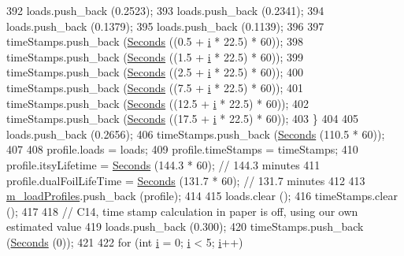 \begin{DoxyCode}
392       loads.push\_back (0.2523);
393       loads.push\_back (0.2341);
394       loads.push\_back (0.1379);
395       loads.push\_back (0.1139);
396 
397       timeStamps.push\_back (\hyperlink{group__timecivil_ga33c34b816f8ff6628e33d5c8e9713b9e}{Seconds} ((0.5 + \hyperlink{bernuolliDistribution_8m_a6f6ccfcf58b31cb6412107d9d5281426}{i} * 22.5) * 60));
398       timeStamps.push\_back (\hyperlink{group__timecivil_ga33c34b816f8ff6628e33d5c8e9713b9e}{Seconds} ((1.5 + \hyperlink{bernuolliDistribution_8m_a6f6ccfcf58b31cb6412107d9d5281426}{i} * 22.5) * 60));
399       timeStamps.push\_back (\hyperlink{group__timecivil_ga33c34b816f8ff6628e33d5c8e9713b9e}{Seconds} ((2.5 + \hyperlink{bernuolliDistribution_8m_a6f6ccfcf58b31cb6412107d9d5281426}{i} * 22.5) * 60));
400       timeStamps.push\_back (\hyperlink{group__timecivil_ga33c34b816f8ff6628e33d5c8e9713b9e}{Seconds} ((7.5 + \hyperlink{bernuolliDistribution_8m_a6f6ccfcf58b31cb6412107d9d5281426}{i} * 22.5) * 60));
401       timeStamps.push\_back (\hyperlink{group__timecivil_ga33c34b816f8ff6628e33d5c8e9713b9e}{Seconds} ((12.5 + \hyperlink{bernuolliDistribution_8m_a6f6ccfcf58b31cb6412107d9d5281426}{i} * 22.5) * 60));
402       timeStamps.push\_back (\hyperlink{group__timecivil_ga33c34b816f8ff6628e33d5c8e9713b9e}{Seconds} ((17.5 + \hyperlink{bernuolliDistribution_8m_a6f6ccfcf58b31cb6412107d9d5281426}{i} * 22.5) * 60));
403     \}
404 
405   loads.push\_back (0.2656);
406   timeStamps.push\_back (\hyperlink{group__timecivil_ga33c34b816f8ff6628e33d5c8e9713b9e}{Seconds} (110.5 * 60));
407 
408   profile.loads = loads;
409   profile.timeStamps = timeStamps;
410   profile.itsyLifetime = \hyperlink{group__timecivil_ga33c34b816f8ff6628e33d5c8e9713b9e}{Seconds} (144.3 * 60);      \textcolor{comment}{// 144.3 minutes}
411   profile.dualFoilLifeTime = \hyperlink{group__timecivil_ga33c34b816f8ff6628e33d5c8e9713b9e}{Seconds} (131.7 * 60);  \textcolor{comment}{// 131.7 minutes}
412 
413   \hyperlink{classBatteryLifetimeTest_aee9ad324da18f58ee75689778580c3fb}{m\_loadProfiles}.push\_back (profile);
414 
415   loads.clear ();
416   timeStamps.clear ();
417 
418   \textcolor{comment}{// C14, time stamp calculation in paper is off, using our own estimated value}
419   loads.push\_back (0.300);
420   timeStamps.push\_back (\hyperlink{group__timecivil_ga33c34b816f8ff6628e33d5c8e9713b9e}{Seconds} (0));
421 
422   \textcolor{keywordflow}{for} (\textcolor{keywordtype}{int} \hyperlink{bernuolliDistribution_8m_a6f6ccfcf58b31cb6412107d9d5281426}{i} = 0; \hyperlink{bernuolliDistribution_8m_a6f6ccfcf58b31cb6412107d9d5281426}{i} < 5; \hyperlink{bernuolliDistribution_8m_a6f6ccfcf58b31cb6412107d9d5281426}{i}++)

\end{DoxyCode}
